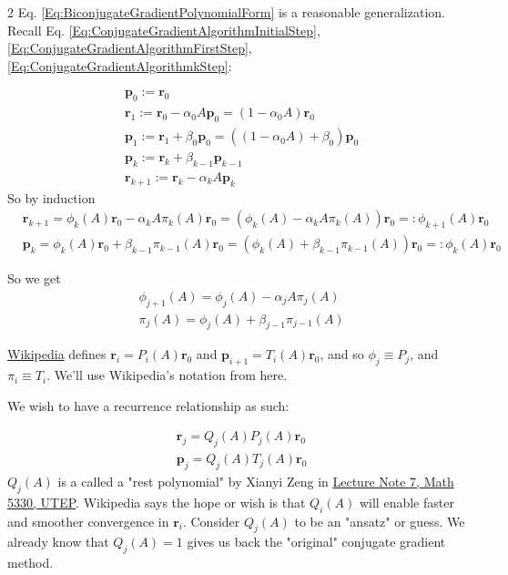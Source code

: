 \documentclass[10pt]{amsart}
\begin{document}
\begin{multicols*}{2}
Eq. \ref{Eq:BiconjugateGradientPolynomialForm} is a reasonable generalization. Recall Eq. \ref{Eq:ConjugateGradientAlgorithmInitialStep}, \ref{Eq:ConjugateGradientAlgorithmFirstStep}, \ref{Eq:ConjugateGradientAlgorithmkStep}: 

\[
\begin{aligned}
& \mathbf{p}_0 := \mathbf{r}_0 \\
& \mathbf{r}_1 := \mathbf{r}_0 - \alpha_0 A \mathbf{p}_0 = (1-\alpha_0 A) \mathbf{r}_0 \\
& \mathbf{p}_1 := \mathbf{r}_1 + \beta_0 \mathbf{p}_0 = ((1-\alpha_0 A) + \beta_0)\mathbf{p}_0 \\	
& \mathbf{p}_k := \mathbf{r}_k + \beta_{k-1} \mathbf{p}_{k-1}  \\
& \mathbf{r}_{k+1} := \mathbf{r}_k - \alpha_{k} A \mathbf{p}_{k}  
\end{aligned}
\]
So by induction
\[
\begin{aligned}
& \mathbf{r}_{k+1} = \phi_k(A) \mathbf{r}_0 - \alpha_k A \pi_k(A) \mathbf{r}_0 = (\phi_k(A) - \alpha_k A \pi_k(A)) \mathbf{r}_0 =: \phi_{k+1}(A) \mathbf{r}_0 \\
& \mathbf{p}_{k} = \phi_k(A) \mathbf{r}_0 + \beta_{k-1}  \pi_{k-1}(A) \mathbf{r}_0 = (\phi_k(A) + \beta_{k-1}  \pi_{k-1}(A)) \mathbf{r}_0 =: \phi_{k}(A) \mathbf{r}_0 
\end{aligned}
\]

So we get
\begin{equation}\label{Eq:BiconjugateGradientMethodPolynomialRecursion}
	\begin{aligned}
		& \phi_{j+1}(A) = \phi_j(A) - \alpha_j A \pi_j(A) \\
		& \pi_j(A) = \phi_j(A) + \beta_{j-1} \pi_{j-1}(A)
	\end{aligned}
\end{equation}

\href{https://en.wikipedia.org/wiki/Biconjugate_gradient_stabilized_method}{Wikipedia} defines $\mathbf{r}_i = P_i(A) \mathbf{r}_0$ and $\mathbf{p}_{i+1} = T_i(A) \mathbf{r}_0$, and so $\phi_j \equiv P_j$, and $\pi_i \equiv T_i$. We'll use Wikipedia's notation from here.

We wish to have a recurrence relationship as such:

\[
\begin{aligned}
	& \mathbf{r}_j = Q_j(A) P_j(A) \mathbf{r}_0 \\
	& \mathbf{p}_j = Q_j(A) T_j(A) \mathbf{r}_0 	
\end{aligned}
\]
$Q_j(A)$ is a called a "rest polynomial" by Xianyi Zeng in \href{https://utminers.utep.edu/xzeng/2017spring_math5330/MATH_5330_Computational_Methods_of_Linear_Algebra_files/ln07.pdf}{Lecture Note 7, Math 5330, UTEP}. Wikipedia says the hope or wish is that $Q_i(A)$ will enable faster and smoother convergence in $\mathbf{r}_i$. Consider $Q_j(A)$ to be an "ansatz" or guess. We already know that $Q_j(A) = 1$ gives us back the "original" conjugate gradient method.



\end{multicols*}
\end{document}
